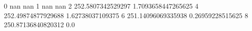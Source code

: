 0 nan nan
1 nan nan
2 252.5807342529297 1.7093658447265625
4 252.49874877929688 1.62738037109375
6 251.14096069335938 0.26959228515625
8 250.87136840820312 0.0
